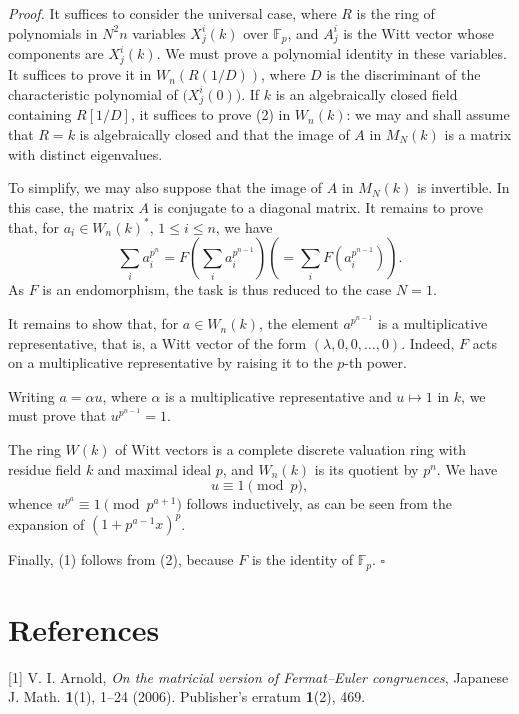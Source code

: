 \documentclass[10pt,a4paper]{article}
\newcommand{\F}{\mathbb F}
\newcommand{\MN}{M_N}
\newcommand{\Wn}{W_n}
\theoremstyle{deligne}
\newenvironment{proofdel}{\textit{Proof.}}{\hfill$\square$}
\begin{document}
\begin{proofdel}
It suffices to consider the universal case, where \(R\) is the ring of polynomials in \(N^2n\) variables \(X^i_j(k)\) over \(\F_p\), and \(A^i_j\) is the Witt vector whose components are \(X^i_j(k)\). We must prove a polynomial identity in these variables. It suffices to prove it in \(\Wn(R(1/D))\), where \(D\) is the discriminant of the characteristic polynomial of \(\bigl(X^i_j(0)\bigr)\). If \(k\) is an algebraically closed field containing \(R[1/D]\), it suffices to prove (2) in \(\Wn(k)\): we may and shall assume that \(R=k\) is algebraically closed and that the image of \(A\) in \(\MN(k)\) is a matrix with distinct eigenvalues.

To simplify, we may also suppose that the image of \(A\) in \(\MN(k)\) is invertible. In this case, the matrix \(A\) is conjugate to a diagonal matrix. It remains to prove that, for \(a_i\in \Wn(k)^*\), \(1\le i\le n\), we have
\[
\sum_i a_i^{p^n}
=F\left(\sum_i a_i^{p^{n-1}}\right)
\left(=\sum_i F\left(a_i^{p^{n-1}}\right)\right).
\]
As \(F\) is an endomorphism, the task is thus reduced to the case \(N=1\).

It remains to show that, for \(a\in \Wn(k)\), the element \(a^{p^{n-1}}\) is a multiplicative representative, that is, a Witt vector of the form \((\lambda,0,0,\ldots,0)\). Indeed, \(F\) acts on a multiplicative representative by raising it to the \(p\)-th power.

Writing \(a=\alpha u\), where \(\alpha\) is a multiplicative representative and \(u\mapsto 1\) in \(k\), we must prove that \(u^{p^{n-1}}=1\).

The ring \(W(k)\) of Witt vectors is a complete discrete valuation ring with residue field \(k\) and maximal ideal \(p\), and \(\Wn(k)\) is its quotient by \(p^n\). We have
\[
u\equiv 1\pmod p,
\]
whence \(u^{p^a}\equiv1\pmod{p^{a+1}}\) follows inductively, as can be seen from the expansion of \((1+p^{a-1}x)^p\).

Finally, (1) follows from (2), because \(F\) is the identity of \(\F_p\).
\end{proofdel}

\section*{References}

[1] V. I. Arnold, \textit{On the matricial version of Fermat--Euler congruences}, Japanese J. Math. \textbf{1}(1), 1--24 (2006). Publisher's erratum \textbf{1}(2), 469.
\end{document}
